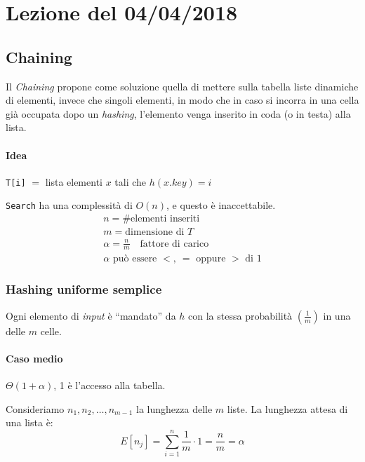 \section{Lezione del 04/04/2018}

\subsection{Chaining}\label{hash:chaining}
Il \emph{Chaining} propone come soluzione quella di mettere sulla tabella liste dinamiche
di elementi, invece che singoli elementi, in modo che in caso si incorra in una cella
già occupata dopo un \emph{hashing}, l'elemento venga inserito in coda (o in testa) alla
lista.

\paragraph{Idea} \texttt{T[i]} $=$ lista elementi $x$ tali che $h(x.key) = i$




\texttt{Search} ha una complessità di $O(n)$, e questo è inaccettabile.
\begin{gather*}
	n = \# \text{elementi inseriti} \\
	m = \text{dimensione di } T \\
	\alpha = \frac{n}{m} \quad \text{fattore di carico} \\
	\alpha \text{ può essere }<, \ = \text{ oppure } > \text{ di } 1
\end{gather*}

\subsubsection{Hashing uniforme semplice}
Ogni elemento di \emph{input} è ``mandato'' da $h$ con la stessa probabilità $\left( \frac{1}{m} \right)$
in una delle $m$ celle.

\paragraph{Caso medio} $\Theta(1 + \alpha)$, 1 è l'accesso alla tabella.\par
Consideriamo $n_1,n_2,\dots,n_{m-1}$ la lunghezza delle $m$ liste. La lunghezza attesa
di una lista è:
$$E[n_j] = \displaystyle\sum_{i = 1}^{n} \frac{1}{m} \cdot 1 = \frac{n}{m} = \alpha$$

